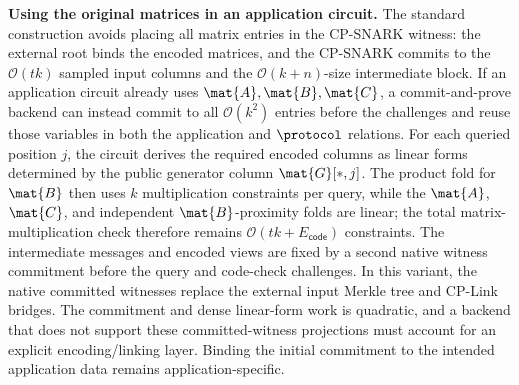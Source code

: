 \noindent\textbf{Using the original matrices in an application circuit.}
The standard construction avoids placing all matrix entries in the CP-SNARK
witness: the external root binds the encoded matrices, and the CP-SNARK commits
to the \(\mathcal{O}(tk)\) sampled input columns and the
\(\mathcal{O}(k+n)\)-size intermediate block.  If an application
circuit already uses \(\mat{A},\mat{B},\mat{C}\), a commit-and-prove backend
can instead commit to all \(\mathcal{O}(k^2)\) entries before the challenges
and reuse those variables in both the application and \(\protocol\) relations.
For each queried position \(j\), the circuit derives the required encoded
columns as linear forms determined by the public generator column
\(\mat{G}[*,j]\).  The product fold for \(\mat{B}\) then uses \(k\)
multiplication constraints per query, while the \(\mat{A}\), \(\mat{C}\), and
independent \(\mat{B}\)-proximity folds are linear; the total
matrix-multiplication check therefore remains
\(\mathcal{O}(tk+E_{\mathsf{code}})\) constraints.  The intermediate messages
and encoded views are fixed by a second native witness commitment before the
query and code-check challenges.  In this variant, the native committed
witnesses replace the external input Merkle tree and CP-Link bridges.  The
commitment and dense linear-form work is quadratic, and a backend that does
not support these committed-witness projections must account for an explicit
encoding/linking layer.  Binding the initial commitment to the intended
application data remains application-specific.

